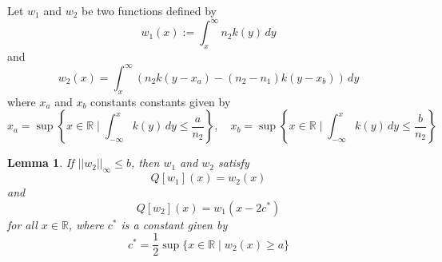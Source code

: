 \documentclass[11pt]{article}
\newtheorem{lem}[thm]{Lemma}
\newtheorem{prop}[thm]{Proposition}
\theoremstyle{definition}
\numberwithin{equation}{section}
\numberwithin{thm}{section}
\renewcommand{\a}{a}
\renewcommand{\b}{b}
\newcommand{\m}{n_1}
\newcommand{\mtwo}{n_2}
\begin{document}
%

 Let $w_1$ and $w_2$ be two functions defined by
\begin{equation} \label{w1}
w_1(x) := \int_x^\infty \mtwo k(y) \, dy
\end{equation}
and
\begin{equation} \label{w2}
w_2(x) = \int_x^\infty \left( \mtwo k(y-x_\a) - (\mtwo-\m)k(y-x_\b)\right) \, dy 
\end{equation} 
where $x_\a$ and $x_\b$ constants constants given by
\begin{equation}
x_\a =\sup\left\{x\in\mathbb R\mid \int_{-\infty}^{x} k(y) \, dy \leq \frac{\a}{\mtwo} \right\}, \quad
x_\b =\sup\left\{x\in\mathbb R\mid \int_{-\infty}^{x} k(y) \, dy \leq \frac{\b}{\mtwo} \right\}
\end{equation}



\begin{lem} \label{lemmamain}
If $ || w_2 ||_\infty \leq \b $, then $w_1$ and $w_2$ satisfy
\begin{equation}
Q[w_1](x) = w_2(x)
\end{equation}
and
\begin{equation}
Q[w_2](x) = w_1(x-2c^*)
\end{equation}
for all $x\in\mathbb R$, where $c^*$ is a constant given by
\begin{equation}
c^* = \frac{1}{2} \sup\{x\in\mathbb R\mid w_2(x)\geq \a\}
\end{equation}
\end{lem}
\end{document}
